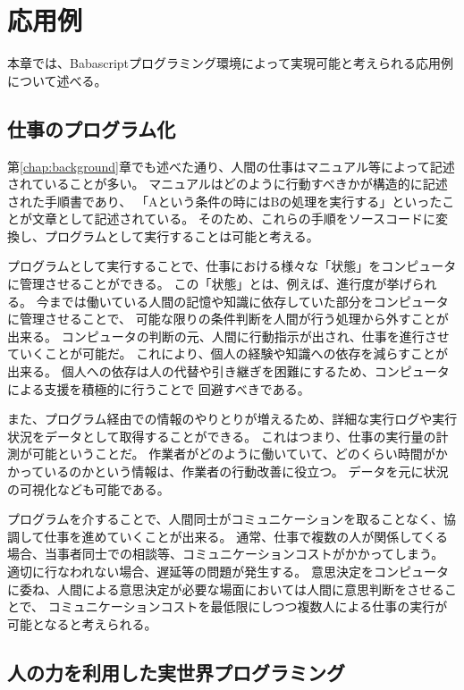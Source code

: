 \chapter{応用例}\label{chap:application}

本章では、Babascriptプログラミング環境によって実現可能と考えられる応用例について述べる。

\newpage

\section{仕事のプログラム化}\label{ux4ed5ux4e8bux306eux30d7ux30edux30b0ux30e9ux30e0ux5316}

第\ref{chap:background}章でも述べた通り、人間の仕事はマニュアル等によって記述されていることが多い。
マニュアルはどのように行動すべきかが構造的に記述された手順書であり、
「Aという条件の時にはBの処理を実行する」といったことが文章として記述されている。
そのため、これらの手順をソースコードに変換し、プログラムとして実行することは可能と考える。

プログラムとして実行することで、仕事における様々な「状態」をコンピュータに管理させることができる。
この「状態」とは、例えば、進行度が挙げられる。
今までは働いている人間の記憶や知識に依存していた部分をコンピュータに管理させることで、
可能な限りの条件判断を人間が行う処理から外すことが出来る。
コンピュータの判断の元、人間に行動指示が出され、仕事を進行させていくことが可能だ。
これにより、個人の経験や知識への依存を減らすことが出来る。
個人への依存は人の代替や引き継ぎを困難にするため、コンピュータによる支援を積極的に行うことで
回避すべきである。

また、プログラム経由での情報のやりとりが増えるため、詳細な実行ログや実行状況をデータとして取得することができる。
これはつまり、仕事の実行量の計測が可能ということだ。
作業者がどのように働いていて、どのくらい時間がかかっているのかという情報は、作業者の行動改善に役立つ。
データを元に状況の可視化なども可能である。

プログラムを介することで、人間同士がコミュニケーションを取ることなく、協調して仕事を進めていくことが出来る。
通常、仕事で複数の人が関係してくる場合、当事者同士での相談等、コミュニケーションコストがかかってしまう。
適切に行なわれない場合、遅延等の問題が発生する。
意思決定をコンピュータに委ね、人間による意思決定が必要な場面においては人間に意思判断をさせることで、
コミュニケーションコストを最低限にしつつ複数人による仕事の実行が可能となると考えられる。

\section{人の力を利用した実世界プログラミング}\label{ux4ebaux306eux529bux3092ux5229ux7528ux3057ux305fux5b9fux4e16ux754cux30d7ux30edux30b0ux30e9ux30dfux30f3ux30b0}

